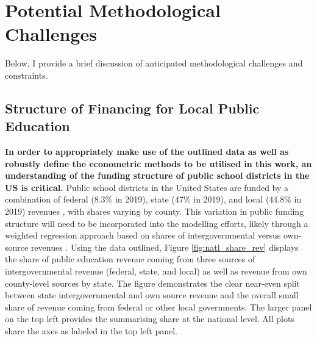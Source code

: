 

\section{Potential Methodological Challenges}
\label{si_section:Challenges}
Below, I provide a brief discussion of anticipated methodological challenges and constraints.

\subsection{Structure of Financing for Local Public Education}
\textbf{In order to appropriately make use of the outlined data as well as robustly define the econometric methods to be utilised in this work, an understanding of the funding structure of public school districts in the US is critical.} Public school districts in the United States are funded by a combination of federal (8.3\% in 2019), state (47\% in 2019), and local (44.8\% in 2019) revenues \cite{skinnerStateLocalFinancing2019}, with shares varying by county. This variation in public funding structure will need to be incorporated into the modelling efforts, likely through a weighted regression approach based on shares of intergovernmental versus own-source revenues \cite{skinnerStateLocalFinancing2019}. Using the data outlined, Figure \ref{fig:natl_share_rev} displays the share of public education revenue coming from three sources of intergovernmental revenue (federal, state, and local) as well as revenue from own county-level sources by state. The figure demonstrates the clear near-even split between state intergovernmental and own source revenue and the overall small share of revenue coming from federal or other local governments. The larger panel on the top left provides the summarising share at the national level. All plots share the axes as labeled in the top left panel.

